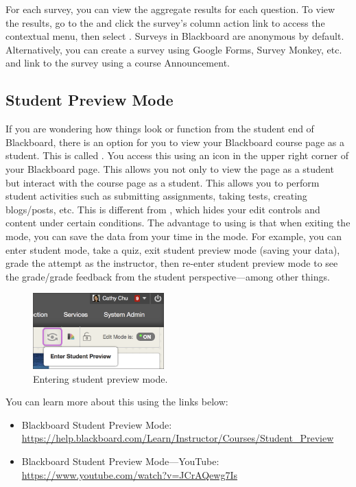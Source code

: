 For each survey, you can view the aggregate results for each question. To view the results, go to the  and click the survey's column action link to access the contextual menu, then select . Surveys in Blackboard are anonymous by default. Alternatively, you can create a survey using Google Forms, Survey Monkey, etc. and link to the survey using a course Announcement. 




\subsection{Student Preview Mode}

If you are wondering how things look or function from the student end of Blackboard, there is an option for you to view your Blackboard course page as a student. This is called . You access this using an icon in the upper right corner of your Blackboard page. This allows you not only to view the page as a student but interact with the course page as a student. This allows you to perform student activities such as submitting assignments, taking tests, creating blogs/posts, etc. This is different from , which hides your edit controls and content under certain conditions. The advantage to using  is that when exiting the mode, you can save the data from your time in the mode. For example, you can enter student mode, take a quiz, exit student preview mode (saving your data), grade the attempt as the instructor, then re-enter student preview mode to see the grade/grade feedback from the student perspective---among other things. 

	\begin{figure}[!ht]
	\centering
	\includegraphics[width=0.45\textwidth]{sections/blackboard/images/orig_instr_student_preview_icon}
	\caption{Entering student preview mode.}
	\end{figure}

You can learn more about this using the links below:

	\begin{itemize}
	\item Blackboard Student Preview Mode: \url{https://help.blackboard.com/Learn/Instructor/Courses/Student_Preview}
	\item Blackboard Student Preview Mode---YouTube: \url{https://www.youtube.com/watch?v=JCrAQewg7Is}
	\end{itemize}




